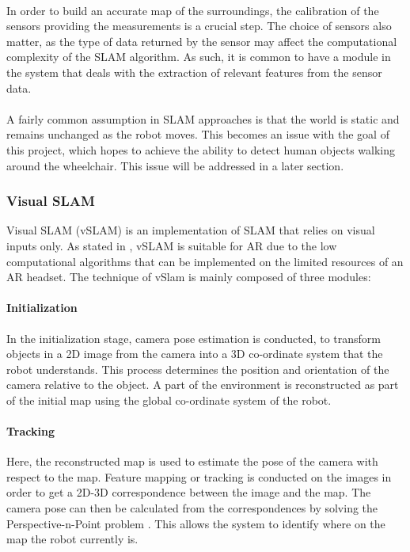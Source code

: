 \paragraph{}In order to build an accurate map of the surroundings, the calibration of the sensors providing the measurements is a crucial step. The choice of sensors also matter, as the type of data returned by the sensor may affect the computational complexity of the SLAM algorithm. As such, it is common to have a module in the system that deals with the extraction of relevant features from the sensor data.

\paragraph{}A fairly common assumption in SLAM approaches is that the world is static and remains unchanged as the robot moves. This becomes an issue with the goal of this project, which hopes to achieve the ability to detect human objects walking around the wheelchair. This issue will be addressed in a later section.

\subsubsection{Visual SLAM}
Visual SLAM (vSLAM) is an implementation of SLAM that relies on visual inputs only. As stated in \cite{Taketomi2017}, vSLAM is suitable for AR due to the low computational algorithms that can be implemented on the limited resources of an AR headset. The technique of vSlam is mainly composed of three modules:

\paragraph{Initialization}
In the initialization stage, camera pose estimation is conducted, to transform objects in a 2D image from the camera into a 3D co-ordinate system that the robot understands. This process determines the position and orientation of the camera relative to the object. A part of the environment is reconstructed as part of the initial map using the global co-ordinate system of the robot.

\paragraph{Tracking}
Here, the reconstructed map is used to estimate the pose of the camera with respect to the map. Feature mapping or tracking is conducted on the images in order to get a 2D-3D correspondence between the image and the map. The camera pose can then be calculated from the correspondences by solving the Perspective-n-Point problem \citep{Nister2004}. This allows the system to identify where on the map the robot currently is.

